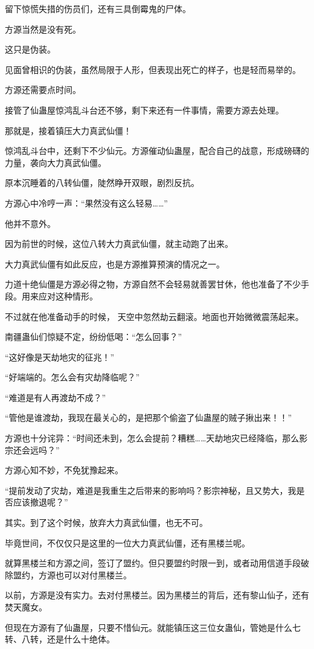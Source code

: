 \begin{this_body}
留下惊慌失措的伤员们，还有三具倒霉鬼的尸体。

方源当然是没有死。

这只是伪装。

见面曾相识的伪装，虽然局限于人形，但表现出死亡的样子，也是轻而易举的。

方源还需要点时间。

接管了仙蛊屋惊鸿乱斗台还不够，剩下来还有一件事情，需要方源去处理。

那就是，接着镇压大力真武仙僵！

惊鸿乱斗台中，还剩下不少仙元。方源催动仙蛊屋，配合自己的战意，形成磅礴的力量，袭向大力真武仙僵。

原本沉睡着的八转仙僵，陡然睁开双眼，剧烈反抗。

方源心中冷哼一声：“果然没有这么轻易……”

他并不意外。

因为前世的时候，这位八转大力真武仙僵，就主动跑了出来。

大力真武仙僵有如此反应，也是方源推算预演的情况之一。

力道十绝仙僵是方源必得之物，方源自然不会轻易就善罢甘休，他也准备了不少手段。用来应对这种情形。

不过就在他准备动手的时候， 天空中忽然劫云翻滚。地面也开始微微震荡起来。

南疆蛊仙们惊疑不定，纷纷低喝：“怎么回事？”

“这好像是天劫地灾的征兆！”

“好端端的。怎么会有灾劫降临呢？”

“难道是有人再渡劫不成？”

“管他是谁渡劫，我现在最关心的，是把那个偷盗了仙蛊屋的贼子揪出来！！”

方源也十分诧异：“时间还未到，怎么会提前？糟糕……天劫地灾已经降临，那么影宗还会远吗？”

方源心知不妙，不免犹豫起来。

“提前发动了灾劫，难道是我重生之后带来的影响吗？影宗神秘，且又势大，我是否应该撤退呢？”

其实。到了这个时候，放弃大力真武仙僵，也无不可。

毕竟世间，不仅仅只是这里的一位大力真武仙僵，还有黑楼兰呢。

就算黑楼兰和方源之间，签订了盟约。但只要盟约时限一到，或者动用信道手段破除盟约，方源也可以对付黑楼兰。

以前，方源是没有实力。去对付黑楼兰。因为黑楼兰的背后，还有黎山仙子，还有焚天魔女。

但现在方源有了仙蛊屋，只要不惜仙元。就能镇压这三位女蛊仙，管她是什么七转、八转，还是什么十绝体。


\end{this_body}
